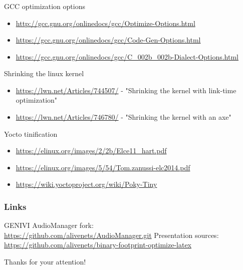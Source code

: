 \documentclass{beamer}
\begin{document}
\begin{frame}
\frametitle{\secname}
\tiny

GCC optimization options

\begin{itemize}
\item \url{http://gcc.gnu.org/onlinedocs/gcc/Optimize-Options.html}
\item \url{https://gcc.gnu.org/onlinedocs/gcc/Code-Gen-Options.html}
\item \url{https://gcc.gnu.org/onlinedocs/gcc/C_002b_002b-Dialect-Options.html}
\end{itemize}

Shrinking the linux kernel

\begin{itemize}
\item \url{https://lwn.net/Articles/744507/} - "Shrinking the kernel with link-time optimization"
\item \url{https://lwn.net/Articles/746780/} - "Shrinking the kernel with an axe"
\end{itemize}

Yocto tinification

\begin{itemize}
\item \url{https://elinux.org/images/2/2b/Elce11_hart.pdf}
\item \url{https://elinux.org/images/5/54/Tom.zanussi-elc2014.pdf}
\item \url{https://wiki.yoctoproject.org/wiki/Poky-Tiny}
\end{itemize}
\end{frame}

\begin{frame}
\frametitle{Links}
\small
GENIVI AudioManager fork: \\ \url{https://github.com/alivenets/AudioManager.git}
\newline \newline
Presentation sources: \\ \url{https://github.com/alivenets/binary-footprint-optimize-latex}
\end{frame}

\begin{frame}{}
\center \Huge Thanks for your attention!
\end{frame}
\end{document}
